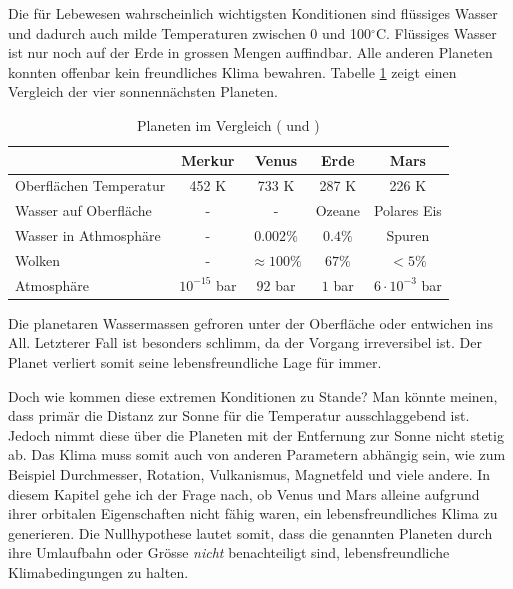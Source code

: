 \begin{refsection}
Die für Lebewesen wahrscheinlich wichtigsten Konditionen sind flüssiges Wasser und dadurch auch milde Temperaturen zwischen 0 und 100$^\circ$C. Flüssiges Wasser ist nur noch auf der Erde in grossen Mengen auffindbar.
Alle anderen Planeten konnten offenbar kein freundliches Klima bewahren. Tabelle \ref{planeten_comparison} zeigt einen Vergleich der vier sonnennächsten Planeten.
\begin{table}
	\centering
	\begin{tabular}{l|c c c c}
							& Merkur			& Venus				& Erde		& Mars                  \\
  \hline
  Oberflächen Temperatur	& 452 K				& 733 K				& 287 K		& 226 K                 \\
  Wasser auf Oberfläche		& -					& -					& Ozeane	& Polares Eis			\\
  Wasser in Athmosphäre		& -					& $0.002\%$ 		& $0.4\%$	& Spuren				\\
  Wolken					& -					& $\approx100\%$	& $67\%$  	& $<5\%$                \\
  Atmosphäre				& $10^{-15}$ bar	& $92$ bar			& $1$ bar	& $6 \cdot 10^{-3}$ bar 
\end{tabular}
\caption{Planeten im Vergleich (\cite{planeten:temperatures} und \cite{planeten:cloudcover})}
\label{planeten_comparison}
\end{table}
%
%
%

Die planetaren Wassermassen gefroren unter der Oberfläche oder entwichen ins All. Letzterer Fall ist besonders schlimm, da der Vorgang irreversibel ist. Der Planet verliert somit seine lebensfreundliche Lage für immer.

Doch wie kommen diese extremen Konditionen zu Stande? Man könnte meinen, dass primär die Distanz zur Sonne für die Temperatur ausschlaggebend ist. Jedoch nimmt diese über die Planeten mit der Entfernung zur Sonne nicht stetig ab.
Das Klima muss somit auch von anderen Parametern abhängig sein, wie zum Beispiel Durchmesser, Rotation, Vulkanismus, Magnetfeld und viele andere.
In diesem Kapitel gehe ich der Frage nach, ob Venus und Mars alleine aufgrund ihrer orbitalen Eigenschaften nicht fähig waren, ein lebensfreundliches Klima zu generieren. Die Nullhypothese lautet somit, dass die genannten Planeten durch ihre Umlaufbahn oder Grösse \textit{nicht} benachteiligt sind, lebensfreundliche Klimabedingungen zu halten.
%


\end{refsection}
